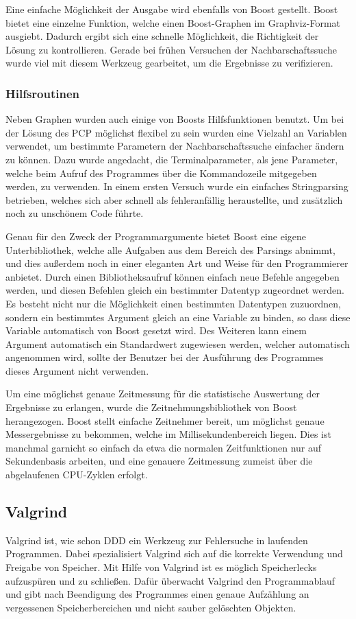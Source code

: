 Eine einfache Möglichkeit der Ausgabe wird ebenfalls von Boost gestellt. Boost bietet eine einzelne Funktion, welche einen Boost-Graphen im Graphviz-Format ausgiebt. Dadurch ergibt sich eine schnelle 
Möglichkeit, die Richtigkeit der Lösung zu kontrollieren. Gerade bei frühen Versuchen der Nachbarschaftssuche wurde viel mit diesem Werkzeug gearbeitet, um die Ergebnisse zu verifizieren. 

\subsubsection{Hilfsroutinen}
Neben Graphen wurden auch einige von Boosts Hilfsfunktionen benutzt. Um bei der Lösung des PCP möglichst flexibel zu sein wurden eine Vielzahl an Variablen verwendet, um bestimmte Parametern der 
Nachbarschaftssuche einfacher ändern zu können. Dazu wurde angedacht, die Terminalparameter, als jene Parameter, welche beim Aufruf des Programmes über die Kommandozeile mitgegeben werden, zu verwenden. 
In einem ersten Versuch wurde ein einfaches Stringparsing betrieben, welches sich aber schnell als fehleranfällig heraustellte, und zusätzlich noch zu unschönem Code führte. 

Genau für den Zweck der Programmargumente bietet Boost eine eigene Unterbibliothek, welche alle Aufgaben aus dem Bereich des Parsings abnimmt, und dies außerdem noch in einer eleganten Art und Weise für
den Programmierer anbietet. Durch einen Bibliotheksaufruf können einfach neue Befehle angegeben werden, und diesen Befehlen gleich ein bestimmter Datentyp zugeordnet werden. Es besteht nicht nur die 
Möglichkeit einen bestimmten Datentypen zuzuordnen, sondern ein bestimmtes Argument gleich an eine Variable zu binden, so dass diese Variable automatisch von Boost gesetzt wird. Des Weiteren kann einem
Argument automatisch ein Standardwert zugewiesen werden, welcher automatisch angenommen wird, sollte der Benutzer bei der Ausführung des Programmes dieses Argument nicht verwenden. 

Um eine möglichst genaue Zeitmessung für die statistische Auswertung der Ergebnisse zu erlangen, wurde die Zeitnehmungsbibliothek von Boost herangezogen. Boost stellt einfache Zeitnehmer bereit, um 
möglichst genaue Messergebnisse zu bekommen, welche im Millisekundenbereich liegen. Dies ist manchmal garnicht so einfach da etwa die normalen Zeitfunktionen nur auf Sekundenbasis arbeiten, und eine 
genauere Zeitmessung zumeist über die abgelaufenen CPU-Zyklen erfolgt.

\subsection{Valgrind}
Valgrind ist, wie schon DDD ein Werkzeug zur Fehlersuche in laufenden Programmen. Dabei spezialisiert Valgrind sich auf die korrekte Verwendung und Freigabe von Speicher. Mit Hilfe von Valgrind ist es
möglich Speicherlecks aufzuspüren und zu schließen. Dafür überwacht Valgrind den Programmablauf und gibt nach Beendigung des Programmes einen genaue Aufzählung an vergessenen Speicherbereichen und 
nicht sauber gelöschten Objekten. 

